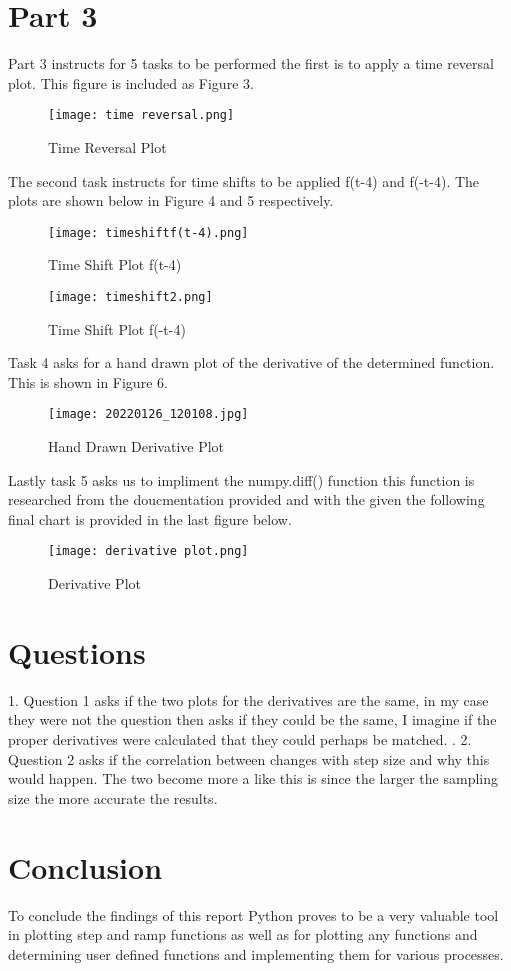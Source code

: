 \documentclass[12pt]{report}
\begin{document}
\section{Part 3}

Part 3 instructs for 5 tasks to be performed the first is to apply a time reversal plot. This figure is included as Figure 3.

\begin{figure}[htp]
    \centering
    \texttt{[image: time reversal.png]}
    \caption{Time Reversal Plot}
    \label{fig:time revarsal.png}
\end{figure}

The second task instructs for time shifts to be applied f(t-4) and f(-t-4). The plots are shown below in Figure 4 and 5 respectively. 


\begin{figure}[htp]
    \centering
    \texttt{[image: timeshiftf(t-4).png]}
    \caption{Time Shift Plot f(t-4)}
    \label{fig:timeshift.png}
\end{figure}

\begin{figure}[htp]
    \centering
    \texttt{[image: timeshift2.png]}
    \caption{Time Shift Plot f(-t-4)}
    \label{fig:timeshiftw.png}
\end{figure}

Task 4 asks for a hand drawn plot of the derivative of the determined function. This is shown in Figure 6.
\begin{figure}[htp]
    \centering
    \texttt{[image: 20220126\_120108.jpg]}
    \caption{Hand Drawn Derivative Plot}
    \label{fig:diffplot.png}
\end{figure}

Lastly task 5 asks us to impliment the numpy.diff() function this function is researched from the doucmentation provided and with the given the following final chart is provided in the last figure below. 

\begin{figure}[htp]
    \centering
    \texttt{[image: derivative plot.png]}
    \caption{Derivative Plot}
    \label{fig:numpydiffplot.png}
\end{figure}

\section{Questions}
1. Question 1 asks if the two plots for the derivatives are the same, in my case they were not the question then asks if they could be the same, I imagine if the proper derivatives were calculated that they could perhaps be matched. \newline.
2. Question 2 asks if the correlation between changes with step size and why this would happen. The two become more a like this is since the larger the sampling size the more accurate the results. 

\section{Conclusion}

To conclude the findings of this report Python proves to be a very valuable tool in plotting step and ramp functions as well as for plotting any functions and determining user defined functions and implementing them for various processes. 

\newpage
\end{document}
